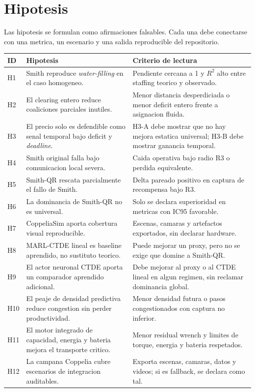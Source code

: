 ﻿\section{Hipotesis}

Las hipotesis se formulan como afirmaciones falsables. Cada una debe conectarse con una
metrica, un escenario y una salida reproducible del repositorio.

\begin{tabularx}{\textwidth}{@{}p{}X X@{}}
\toprule
ID & Hipotesis & Criterio de lectura \\
\midrule
H1 & Smith reproduce \emph{water-filling} en el caso homogeneo. & Pendiente cercana a 1 y $R^2$ alto entre staffing teorico y observado. \\
H2 & El clearing entero reduce coaliciones parciales inutiles. & Menor distancia desperdiciada o menor deficit entero frente a asignacion fluida. \\
H3 & El precio solo es defendible como senal temporal bajo deficit y \emph{deadline}. & H3-A debe mostrar que no hay mejora estatica universal; H3-B debe mostrar ganancia temporal. \\
H4 & Smith original falla bajo comunicacion local severa. & Caida operativa bajo radio R3 o perdida equivalente. \\
H5 & Smith-QR rescata parcialmente el fallo de Smith. & Delta pareado positivo en captura de recompensa bajo R3. \\
H6 & La dominancia de Smith-QR no es universal. & Solo se declara superioridad en metricas con IC95 favorable. \\
H7 & CoppeliaSim aporta cobertura visual reproducible. & Escenas, camaras y artefactos exportados, sin declarar hardware. \\
H8 & MARL-CTDE lineal es baseline aprendido, no sustituto teorico. & Puede mejorar un proxy, pero no se exige que domine a Smith-QR. \\
H9 & El actor neuronal CTDE aporta un comparador aprendido adicional. & Debe mejorar al proxy o al CTDE lineal en algun regimen, sin reclamar dominancia global. \\
H10 & El peaje de densidad predictiva reduce congestion sin perder productividad. & Menor densidad futura o pasos congestionados con captura no inferior. \\
H11 & El motor integrado de capacidad, energia y bateria mejora el transporte critico. & Menor residual wrench y limites de torque, energia y bateria respetados. \\
H12 & La campana Coppelia cubre escenarios de integracion auditables. & Exporta escenas, camaras, datos y videos; si es fallback, se declara como tal. \\
\bottomrule
\end{tabularx}

